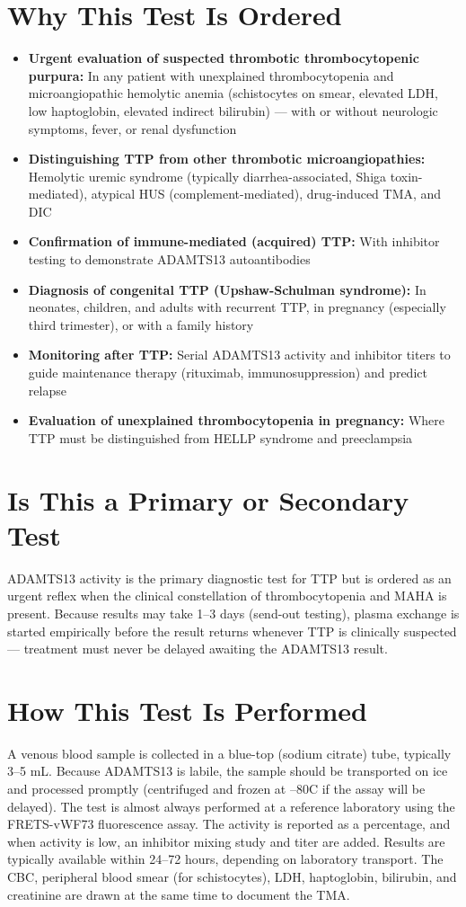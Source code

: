 \section*{Why This Test Is Ordered}
\begin{itemize}
  \item \textbf{Urgent evaluation of suspected thrombotic thrombocytopenic purpura:} In any patient with unexplained thrombocytopenia and microangiopathic hemolytic anemia (schistocytes on smear, elevated LDH, low haptoglobin, elevated indirect bilirubin) --- with or without neurologic symptoms, fever, or renal dysfunction
  \item \textbf{Distinguishing TTP from other thrombotic microangiopathies:} Hemolytic uremic syndrome (typically diarrhea-associated, Shiga toxin-mediated), atypical HUS (complement-mediated), drug-induced TMA, and DIC
  \item \textbf{Confirmation of immune-mediated (acquired) TTP:} With inhibitor testing to demonstrate ADAMTS13 autoantibodies
  \item \textbf{Diagnosis of congenital TTP (Upshaw-Schulman syndrome):} In neonates, children, and adults with recurrent TTP, in pregnancy (especially third trimester), or with a family history
  \item \textbf{Monitoring after TTP:} Serial ADAMTS13 activity and inhibitor titers to guide maintenance therapy (rituximab, immunosuppression) and predict relapse
  \item \textbf{Evaluation of unexplained thrombocytopenia in pregnancy:} Where TTP must be distinguished from HELLP syndrome and preeclampsia
\end{itemize}

\section*{Is This a Primary or Secondary Test}
ADAMTS13 activity is the primary diagnostic test for TTP but is ordered as an urgent reflex when the clinical constellation of thrombocytopenia and MAHA is present. Because results may take 1--3 days (send-out testing), plasma exchange is started empirically before the result returns whenever TTP is clinically suspected --- treatment must never be delayed awaiting the ADAMTS13 result.

\section*{How This Test Is Performed}
A venous blood sample is collected in a blue-top (sodium citrate) tube, typically 3--5 mL. Because ADAMTS13 is labile, the sample should be transported on ice and processed promptly (centrifuged and frozen at --80\textdegree{}C if the assay will be delayed). The test is almost always performed at a reference laboratory using the FRETS-vWF73 fluorescence assay. The activity is reported as a percentage, and when activity is low, an inhibitor mixing study and titer are added. Results are typically available within 24--72 hours, depending on laboratory transport. The CBC, peripheral blood smear (for schistocytes), LDH, haptoglobin, bilirubin, and creatinine are drawn at the same time to document the TMA.

